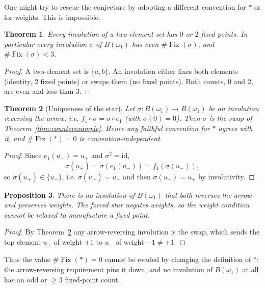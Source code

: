 \documentclass[11pt]{article}
\newtheorem{theorem}{Theorem}
\newtheorem{proposition}[theorem]{Proposition}
\theoremstyle{definition}
\theoremstyle{remark}
\newcommand{\Fix}{\operatorname{Fix}}
\begin{document}
One might try to rescue the conjecture by adopting a different convention for
$*$ or for weights. This is impossible.

\begin{theorem}\label{thm:involution}
Every involution of a two-element set has $0$ or $2$ fixed points. In
particular every involution $\sigma$ of $B(\omega_1)$ has even
$\#\Fix(\sigma)$, and $\#\Fix(\sigma) < 3$.
\end{theorem}

\begin{proof}
A two-element set is $\{a,b\}$. An involution either fixes both elements
(identity, $2$ fixed points) or swaps them (no fixed points). Both counts, $0$
and $2$, are even and less than $3$.
\end{proof}

\begin{theorem}[Uniqueness of the star]\label{thm:uniqueness}
Let $\sigma : B(\omega_1) \to B(\omega_1)$ be an involution reversing the arrow,
i.e. $f_1 \circ \sigma = \sigma \circ e_1$ (with $\sigma(0)=0$). Then $\sigma$
is the swap of Theorem~\ref{thm:counterexample}. Hence any faithful convention
for $*$ agrees with it, and $\#\Fix(*) = 0$ is convention-independent.
\end{theorem}

\begin{proof}
Since $e_1(u_-) = u_+$ and $\sigma^2 = \mathrm{id}$,
\[
\sigma(u_+) = \sigma(e_1(u_-)) = f_1(\sigma(u_-)),
\]
so $\sigma(u_+) \in \{u_-\}$, i.e. $\sigma(u_+) = u_-$ and then
$\sigma(u_-) = u_+$ by involutivity.
\end{proof}

\begin{proposition}\label{prop:no-weight-preserving}
There is no involution of $B(\omega_1)$ that both reverses the arrow and
preserves weights. The forced star negates weights, so the weight condition
cannot be relaxed to manufacture a fixed point.
\end{proposition}

\begin{proof}
By Theorem~\ref{thm:uniqueness} any arrow-reversing involution is the swap,
which sends the top element $u_+$ of weight $+1$ to $u_-$ of weight $-1 \ne +1$.
\end{proof}

Thus the value $\#\Fix(*) = 0$ cannot be evaded by changing the definition of
$*$: the arrow-reversing requirement pins it down, and no involution of
$B(\omega_1)$ at all has an odd or $\ge 3$ fixed-point count.
\end{document}
